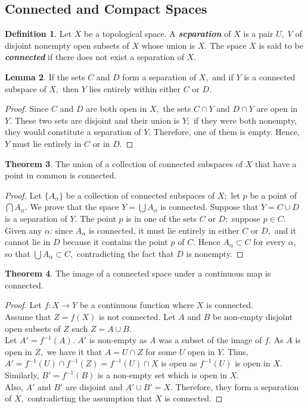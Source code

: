 \documentclass{article}
\theoremstyle{definition}
\newtheorem{theorem}{Theorem}[section]
\newtheorem{lem}[theorem]{Lemma}
\newtheorem{defn}[theorem]{Definition}
\begin{document}
\subsection{Connected and Compact Spaces}
\begin{defn}
  Let $X$ be a topological space. A \textbf{\emph{separation}} of $X$ is a pair $U,\; V$ of disjoint nonempty open subsets of $X$ whose union is $X.$ The space $X$ is said to be \textbf{\emph{connected}} if there does not exist a separation of $X.$
\end{defn}
%
\begin{lem}
  If the sets $C$ and $D$ form a separation of $X,$ and if $Y$ is a connected subspace of $X,$ then $Y$ lies entirely within either $C$ or $D.$
\end{lem}
\begin{proof}
  Since $C$ and $D$ are both open in $X,$ the sets $C\cap Y$ and $D\cap Y$ are open in $Y.$ These two sets are disjoint and their union is $Y;$ if they were both nonempty, they would constitute a separation of $Y.$ Therefore, one of them is empty. Hence, $Y$ must lie entirely in $C$ or in $D.$
\end{proof}
%
\begin{theorem}
  The union of a collection of connected subspaces of $X$ that have a point in common is connected.
\end{theorem}
\begin{proof}
  Let $\{A_\alpha\}$ be a collection of connected subspaces of $X;$ let $p$ be a point of $\bigcap A_\alpha.$ We prove that the space $Y = \bigcup A_\alpha$ is connected. Suppose that $Y = C \cup D$ is a separation of $Y.$ The point $p$ is in one of the sets $C$ or $D;$ suppose $p \in C.$ Given any $\alpha$: since $A_\alpha$ is connected, it must lie entirely in either $C$ or $D,$ and it cannot lie in $D$ because it contains the point $p$ of $C.$ Hence $A_\alpha \subset C$ for every $\alpha,$ so that $\bigcup A_\alpha \subset C,$ contradicting the fact that $D$ is nonempty.
\end{proof}
%
\begin{theorem}\label{thm:connected image}
  The image of a connected space under a continuous map is connected.
\end{theorem}
\begin{proof}
  Let $f:X\longrightarrow Y$ be a continuous function where $X$ is connected.\\
  Assume that $Z = f(X)$ is not connected. Let $A$ and $B$ be non-empty disjoint open subsets of $Z$ such $Z = A \cup B.$\\
  Let $A' = f^{-1}(A).$ $A'$ is non-empty as $A$ was a subset of the image of $f.$ As $A$ is open in $Z,$ we have it that $A = U \cap Z$ for some $U$ open in $Y.$ Thus, $A' = f^{-1}(U) \cap f^{-1}(Z) = f^{-1}(U) \cap X$ is open as $f^{-1}(U)$ is open in $X.$\\
  Similarly, $B' = f^{-1}(B)$ is a non-empty set which is open in $X.$\\
  Also, $A'$ and $B'$ are disjoint and $A' \cup B' = X.$ Therefore, they form a separation of $X,$ contradicting the assumption that $X$ is connected.
\end{proof}
\end{document}
